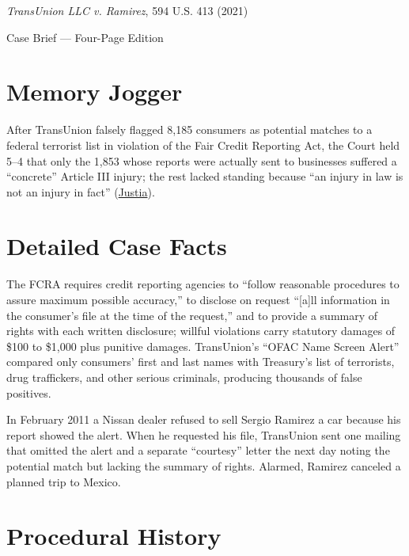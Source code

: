 \documentclass[12pt]{article}
\begin{document}
\begin{center}
{\LARGE \textit{TransUnion LLC v. Ramirez}, 594 U.S. 413 (2021)\par}
\vspace{0.8em}
{\large Case Brief --- Four-Page Edition\par}
\end{center}
\vspace{1em}

\section{Memory Jogger}

After TransUnion falsely flagged 8,185 consumers as potential matches to a federal terrorist list in violation of the Fair Credit Reporting Act, the Court held 5--4 that only the 1,853 whose reports were actually sent to businesses suffered a ``concrete'' Article III injury; the rest lacked standing because ``an injury in law is not an injury in fact'' (\href{https://supreme.justia.com/cases/federal/us/594/20-297/}{Justia}).

\section{Detailed Case Facts}

The FCRA requires credit reporting agencies to ``follow reasonable procedures to assure maximum possible accuracy,'' to disclose on request ``[a]ll information in the consumer's file at the time of the request,'' and to provide a summary of rights with each written disclosure; willful violations carry statutory damages of \$100 to \$1,000 plus punitive damages. TransUnion's ``OFAC Name Screen Alert'' compared only consumers' first and last names with Treasury's list of terrorists, drug traffickers, and other serious criminals, producing thousands of false positives.

In February 2011 a Nissan dealer refused to sell Sergio Ramirez a car because his report showed the alert. When he requested his file, TransUnion sent one mailing that omitted the alert and a separate ``courtesy'' letter the next day noting the potential match but lacking the summary of rights. Alarmed, Ramirez canceled a planned trip to Mexico.

\section{Procedural History}
\end{document}
